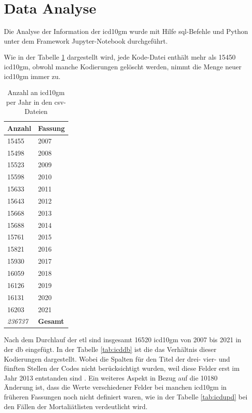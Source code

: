 \section{Data Analyse} \label{dataanalysis}
Die Analyse der Information der \ac{icd10gm} wurde mit Hilfe \ac{sql}-Befehle und Python unter dem Framework Jupyter-Notebook durchgeführt.

Wie in der Tabelle \ref{tab:icdfiles} dargestellt wird, jede Kode-Datei enthält mehr als \textsf{15450} \ac{icd10gm}, obwohl manche Kodierungen gelöscht werden, nimmt die Menge neuer \ac{icd10gm} immer zu.

\begin{table}[ht]
	\centering
	\small
	\caption[\acs{icd10gm} in den \acs{csv}-Dateien]{Anzahl an \acs{icd10gm} per Jahr in den \ac{csv}-Dateien}
	\label{tab:icdfiles}
	\begin{tabular}{|l|l|}
		\hline
	\rowcolor{lightgray} Anzahl & Fassung \\ \hline 
		15455 & 2007 \\ \hline
		15498 & 2008 \\ \hline
		15523 & 2009 \\ \hline
		15598 & 2010 \\ \hline
		15633 & 2011 \\ \hline
		15643 & 2012 \\ \hline
		15668 & 2013 \\ \hline
		15688 & 2014 \\ \hline
		15761 & 2015 \\ \hline
		15821 & 2016 \\ \hline
		15930 & 2017 \\ \hline
		16059 & 2018 \\ \hline
		16126 & 2019 \\ \hline
		16131 & 2020 \\ \hline
		16203 & 2021 \\ \hline
		\hline
		\textit{236737} & \textbf{Gesamt} \\ \hline
	\end{tabular}
	\end{table}

Nach dem Durchlauf der \ac{etl} sind insgesamt \textsf{16520} \ac{icd10gm} von 2007 bis 2021 in der \ac{db} eingefügt. In der Tabelle \ref{tab:icddb} ist die das Verhältnis dieser Kodierungen dargestellt. Wobei die Spalten für den Titel der drei- vier- und fünften Stellen der Codes nicht berücksichtigt wurden, weil diese Felder erst im Jahr 2013 entstanden sind \cite{readme13}. Ein weiteres Aspekt in Bezug auf die \textsf{10180} Änderung ist, dass die Werte verschiedener Felder  bei manchen \ac{icd10gm} in früheren Fassungen noch nicht definiert waren, wie in der Tabelle \ref{tab:icdupd} bei den Fällen der Mortaliätlisten verdeutlicht wird.

